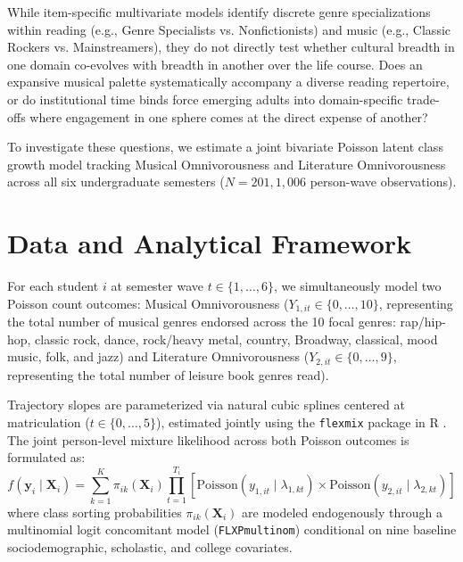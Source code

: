 \documentclass[12pt]{article}
\begin{document}
While item-specific multivariate models identify discrete genre specializations within reading (e.g., Genre Specialists vs. Nonfictionists) and music (e.g., Classic Rockers vs. Mainstreamers), they do not directly test whether cultural breadth in one domain co-evolves with breadth in another over the life course. Does an expansive musical palette systematically accompany a diverse reading repertoire, or do institutional time binds force emerging adults into domain-specific trade-offs where engagement in one sphere comes at the direct expense of another?

To investigate these questions, we estimate a joint bivariate Poisson latent class growth model tracking Musical Omnivorousness and Literature Omnivorousness across all six undergraduate semesters ($N = 201, 1,006$ person-wave observations).

\section{Data and Analytical Framework}

For each student $i$ at semester wave $t \in \{1, \dots, 6\}$, we simultaneously model two Poisson count outcomes: Musical Omnivorousness ($Y_{1, it} \in \{0, \dots, 10\}$, representing the total number of musical genres endorsed across the 10 focal genres: rap/hip-hop, classic rock, dance, rock/heavy metal, country, Broadway, classical, mood music, folk, and jazz) and Literature Omnivorousness ($Y_{2, it} \in \{0, \dots, 9\}$, representing the total number of leisure book genres read). 

Trajectory slopes are parameterized via natural cubic splines centered at matriculation ($t \in \{0, \dots, 5\}$), estimated jointly using the \texttt{flexmix} package \citep{grun2008flexmix} in \textsf{R} \citep{Rmanual}. The joint person-level mixture likelihood across both Poisson outcomes is formulated as:
\begin{equation}
f(\mathbf{y}_i \mid \mathbf{X}_i) = \sum_{k=1}^K \pi_{ik}(\mathbf{X}_i) \prod_{t=1}^{T_i} \left[ \text{Poisson}(y_{1, it} \mid \lambda_{1, kt}) \times \text{Poisson}(y_{2, it} \mid \lambda_{2, kt}) \right]
\end{equation}
where class sorting probabilities $\pi_{ik}(\mathbf{X}_i)$ are modeled endogenously through a multinomial logit concomitant model (\texttt{FLXPmultinom}) conditional on nine baseline sociodemographic, scholastic, and college covariates.
\end{document}
